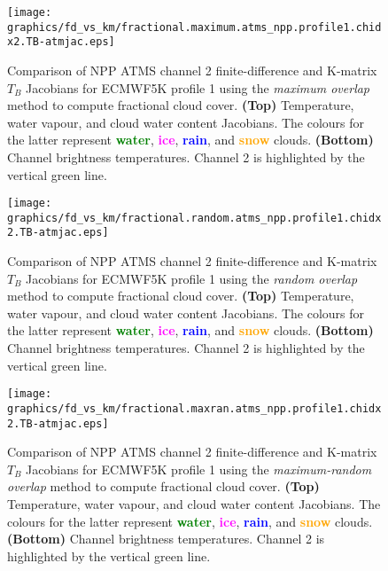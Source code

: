 \begin{figure}[H]
  \caption{Comparison of NPP ATMS channel 2 finite-difference and K-matrix $T_B$ Jacobians for ECMWF5K profile 1 using the \emph{maximum overlap} method to compute fractional cloud cover. \textbf{(Top)} Temperature, water vapour, and cloud water content Jacobians. The colours for the latter represent \textcolor{green}{\textbf{water}}, \textcolor{magenta}{\textbf{ice}}, \textcolor{blue}{\textbf{rain}}, and \textcolor{orange}{\textbf{snow}} clouds. \textbf{(Bottom)} Channel brightness temperatures. Channel 2 is highlighted by the vertical green line.}
  \label{fig:fractional.maximum.atms_npp.profile1.chidx2.TB-atmjac}
  \centering
  \texttt{[image: graphics/fd\_vs\_km/fractional.maximum.atms\_npp.profile1.chidx2.TB-atmjac.eps]}
\end{figure}


\begin{figure}[H]
  \caption{Comparison of NPP ATMS channel 2 finite-difference and K-matrix $T_B$ Jacobians for ECMWF5K profile 1 using the \emph{random overlap} method to compute fractional cloud cover. \textbf{(Top)} Temperature, water vapour, and cloud water content Jacobians. The colours for the latter represent \textcolor{green}{\textbf{water}}, \textcolor{magenta}{\textbf{ice}}, \textcolor{blue}{\textbf{rain}}, and \textcolor{orange}{\textbf{snow}} clouds. \textbf{(Bottom)} Channel brightness temperatures. Channel 2 is highlighted by the vertical green line.}
  \label{fig:fractional.random.atms_npp.profile1.chidx2.TB-atmjac}
  \centering
  \texttt{[image: graphics/fd\_vs\_km/fractional.random.atms\_npp.profile1.chidx2.TB-atmjac.eps]}
\end{figure}


\begin{figure}[H]
  \caption{Comparison of NPP ATMS channel 2 finite-difference and K-matrix $T_B$ Jacobians for ECMWF5K profile 1 using the \emph{maximum-random overlap} method to compute fractional cloud cover. \textbf{(Top)} Temperature, water vapour, and cloud water content Jacobians. The colours for the latter represent \textcolor{green}{\textbf{water}}, \textcolor{magenta}{\textbf{ice}}, \textcolor{blue}{\textbf{rain}}, and \textcolor{orange}{\textbf{snow}} clouds. \textbf{(Bottom)} Channel brightness temperatures. Channel 2 is highlighted by the vertical green line.}
  \label{fig:fractional.maxran.atms_npp.profile1.chidx2.TB-atmjac}
  \centering
  \texttt{[image: graphics/fd\_vs\_km/fractional.maxran.atms\_npp.profile1.chidx2.TB-atmjac.eps]}
\end{figure}


